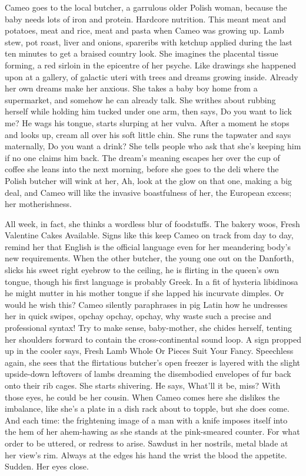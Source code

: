 \documentclass[
]{memoir}
\begin{document}
Cameo goes to the local butcher, a garrulous older Polish woman, because
the baby needs lots of iron and protein. Hardcore nutrition. This meant
meat and potatoes, meat and rice, meat and pasta when Cameo was growing
up. Lamb stew, pot roast, liver and onions, spareribs with ketchup
applied during the last ten minutes to get a braised country look. She
imagines the placental tissue forming, a red sirloin in the epicentre of
her psyche. Like drawings she happened upon at a gallery, of galactic
uteri with trees and dreams growing inside. Already her own dreams make
her anxious. She takes a baby boy home from a supermarket, and somehow
he can already talk. She writhes about rubbing herself while holding him
tucked under one arm, then says, Do you want to lick me? He wags his
tongue, starts slurping at her vulva. After a moment he stops and looks
up, cream all over his soft little chin. She runs the tapwater and says
maternally, Do you want a drink? She tells people who ask that she's
keeping him if no one claims him back. The dream's meaning escapes her
over the cup of coffee she leans into the next morning, before she goes
to the deli where the Polish butcher will wink at her, Ah, look at the
glow on that one, making a big deal, and Cameo will like the invasive
boastfulness of her, the European excess; her motherishness.

All week, in fact, she thinks a wordless blur of foodstuffs. The bakery
woos, Fresh Valentine Cakes Available. Signs like this keep Cameo on
track from day to day, remind her that English is the official language
even for her meandering body's new requirements. When the other butcher,
the young one out on the Danforth, slicks his sweet right eyebrow to the
ceiling, he is flirting in the queen's own tongue, though his first
language is probably Greek. In a fit of hysteria libidinosa he might
mutter in his mother tongue if she lapped his incurvate dimples. Or
would he wish this? Cameo silently paraphrases in pig Latin how he
undresses her in quick swipes, opchay opchay, opchay, why waste such a
precise and professional syntax! Try to make sense, baby-mother, she
chides herself, tenting her shoulders forward to contain the
cross-continental sound loop. A sign propped up in the cooler says,
Fresh Lamb Whole Or Pieces Suit Your Fancy. Speechless again, she sees
that the flirtatious butcher's open freezer is layered with the slight
upside-down leftovers of lambs dreaming the disembodied envelopes of fur
back onto their rib cages. She starts shivering. He says, What'll it be,
miss? With those eyes, he could be her cousin. When Cameo comes here she
dislikes the imbalance, like she's a plate in a dish rack about to
topple, but she does come. And each time: the frightening image of a man
with a knife imposes itself into the hem of her ahem-hawing as she
stands at the pink-smeared counter. For what order to be uttered, or
redress to arise. Sawdust in her nostrils, metal blade at her view's
rim. Always at the edges his hand the wrist the blood the appetite.
Sudden. Her eyes close.
\end{document}
